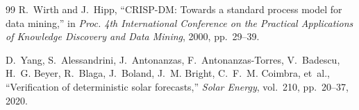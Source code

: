 \documentclass[11pt,a4paper]{article}
\begin{document}
\begin{thebibliography}{99}
R.~Wirth and J.~Hipp,
``CRISP-DM: Towards a standard process model for data mining,''
in \emph{Proc. 4th International Conference on the Practical Applications of
Knowledge Discovery and Data Mining}, 2000, pp.~29--39.

D.~Yang, S.~Alessandrini, J.~Antonanzas, F.~Antonanzas-Torres, V.~Badescu,
H.~G. Beyer, R.~Blaga, J.~Boland, J.~M. Bright, C.~F.~M. Coimbra, et~al.,
``Verification of deterministic solar forecasts,''
\emph{Solar Energy}, vol.~210, pp.~20--37, 2020.

\end{thebibliography}
\end{document}
